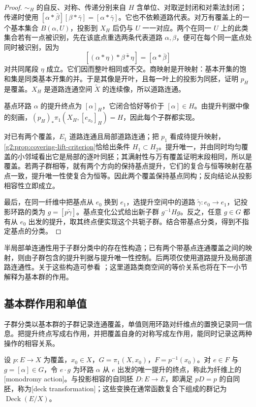 \begin{proof}
	\(\sim_H\) 的自反、对称、传递分别来自 \(H\) 含单位、对取逆封闭和对乘法封闭；传递时使用 \([\alpha*\bar\beta][\beta*\bar\gamma]=[\alpha*\bar\gamma]\)。它也不依赖道路代表。对万有覆盖上的一个基本集合 \(B(\alpha,U)\)，投影到 \(X_H\) 后仍与 \(U\) 一一对应。两个在同一 \(U\) 上的此类集合若有一点被识别，先在该底点重选两条代表道路 \(\alpha,\beta\)，便可在每个同一底点处同时被识别，因为
	\[
		[(\alpha*\eta)*\overline{\beta*\eta}]=[\alpha*\bar\beta]
	\]
	对共同尾段 \(\eta\) 成立。它们因而整叶相同或不交。商映射是开映射：基本开集的饱和集是同类基本开集的并。于是其像是开叶，且每一叶上的投影为同胚，证明 \(p_H\) 是覆盖。\(X_H\) 是道路连通空间 \(\widetilde X\) 的连续像，所以道路连通。

	基点环路 \(\alpha\) 的提升终点为 \([\alpha]_H\)，它闭合恰好等价于 \([\alpha]\in H\)。由提升判据中像的刻画，\((p_H)_*\pi_1(X_H,[e_{x_0}]_H)=H\)，因此每个子群都实现。

	对已有两个覆盖，\(E_1\) 道路连通且局部道路连通；把 \(p_1\) 看成待提升映射，\cref{g2:prop:covering-lift-criterion}恰给出条件 \(H_1\subset H_2\)。提升唯一，并由同时均匀覆盖的小邻域看出它是局部的逐叶同胚；其满射性与万有覆盖证明末段相同，所以是覆盖。若两子群相等，就有两个方向的保持基点提升，它们的复合与恒等映射在基点一致，提升唯一性使复合为恒等。因此两个覆盖保持基点同构；反向结论从投影相容性立即成立。

	最后，在同一纤维中把基点从 \(e_0\) 换到 \(e_1\)，选提升空间中的道路 \(\widetilde\gamma:e_0\rightarrow e_1\)，记投影环路的类为 \(g=[p\widetilde\gamma]\)。基点变化公式给出新子群 \(g^{-1}Hg\)。反之，任意 \(g\in G\) 都有从 \(e_0\) 出发的提升，取其终点便实现这个共轭子群。结合带基点分类，得到不指定基点的分类。
\end{proof}

半局部单连通性用于子群分类中的存在性构造；已有两个带基点连通覆盖之间的映射，则由子群包含的提升判据与提升唯一性控制。后两项仅使用道路提升及局部道路连通性。关于这些构造可参看 \cite[第1.3节]{Hatcher2002}；这里道路类商空间的等价关系也将在下一小节解释为基本群的作用。

\subsection{基本群作用和单值}
\label{g2:subsec:0101:04}
子群分类以基本群的子群记录连通覆盖，单值则用环路对纤维点的置换记录同一信息。把提升终点写成右作用，并把覆盖自身的对称写成左作用，能同时记录这两种操作的相容关系。

\begin{definition}[覆盖的单值作用与覆盖变换]\label{g2:def:monodromy-deck}
	设 \(p:E\rightarrow X\) 为覆盖，\(x_0\in X\)，\(G=\pi_1(X,x_0)\)，\(F=p^{-1}(x_0)\)。对 \(e\in F\) 与 \(g=[\alpha]\in G\)，令 \(e\cdot g\) 为环路 \(\alpha\) 从 \(e\) 出发的唯一提升的终点，称此为纤维上的[monodromy action]。与投影相容的自同胚 \(D:E\rightarrow E\)，即满足 \(pD=p\) 的自同胚，称为[deck transformation]；这些变换在通常函数复合下组成的群记为 \(\operatorname{Deck}(E/X)\)。
\end{definition}

